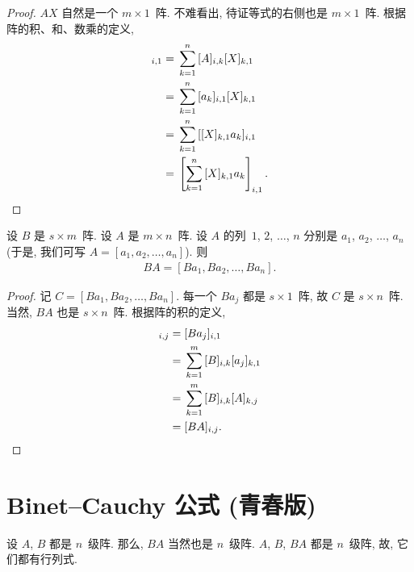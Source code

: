 \documentclass[%
    UTF8,%
    fontset=none,%
    punct=kaiming,%
    zihao=-4,%
    a4paper,%
    oneside,%
]{ctexbook}
\begin{document}
\begin{proof}
    \(AX\) 自然是一个 \(m \times 1\)~阵.
    不难看出, 待证等式的右侧也是 \(m \times 1\)~阵.
    根据阵的积、和、数乘的定义,
    \begin{align*}
        [AX]_{i,1}
        = {} & \sum_{k = 1}^{n} {[A]_{i,k} [X]_{k,1}}
        \\
        = {} & \sum_{k = 1}^{n} {[a_k]_{i,1} [X]_{k,1}}
        \\
        = {} & \sum_{k = 1}^{n} {[[X]_{k,1} a_k]_{i,1}}
        \\
        = {} & \left[ \sum_{k = 1}^{n} {[X]_{k,1}
        a_k } \right]_{i,1}.
        \qedhere
    \end{align*}
\end{proof}

\begin{theorem}
    设 \(B\) 是 \(s \times m\)~阵.
    设 \(A\) 是 \(m \times n\)~阵.
    设 \(A\) 的列~\(1\), \(2\), \(\dots\), \(n\)
    分别是 \(a_1\), \(a_2\), \(\dots\), \(a_n\)
    (于是, 我们可写 \(A = [a_1, a_2, \dots, a_n]\)).
    则
    \begin{align*}
        BA = [Ba_1, Ba_2, \dots, Ba_n].
    \end{align*}
\end{theorem}

\begin{proof}
    记 \(C = [Ba_1, Ba_2, \dots, Ba_n]\).
    每一个 \(Ba_j\) 都是 \(s \times 1\)~阵,
    故 \(C\) 是 \(s \times n\)~阵.
    当然, \(BA\) 也是 \(s \times n\)~阵.
    根据阵的积的定义,
    \begin{align*}
        [C]_{i,j}
        = {} & [Ba_j]_{i,1}
        \\
        = {} & \sum_{k = 1}^{m} {[B]_{i,k} [a_j]_{k,1}}
        \\
        = {} & \sum_{k = 1}^{m} {[B]_{i,k} [A]_{k,j}}
        \\
        = {} & [BA]_{i,j}.
        \qedhere
    \end{align*}
\end{proof}


\section{Binet--Cauchy 公式 (青春版)}

设 \(A\), \(B\) 都是 \(n\)~级阵.
那么, \(BA\) 当然也是 \(n\)~级阵.
\(A\), \(B\), \(BA\) 都是 \(n\)~级阵,
故, 它们都有行列式.
\end{document}
